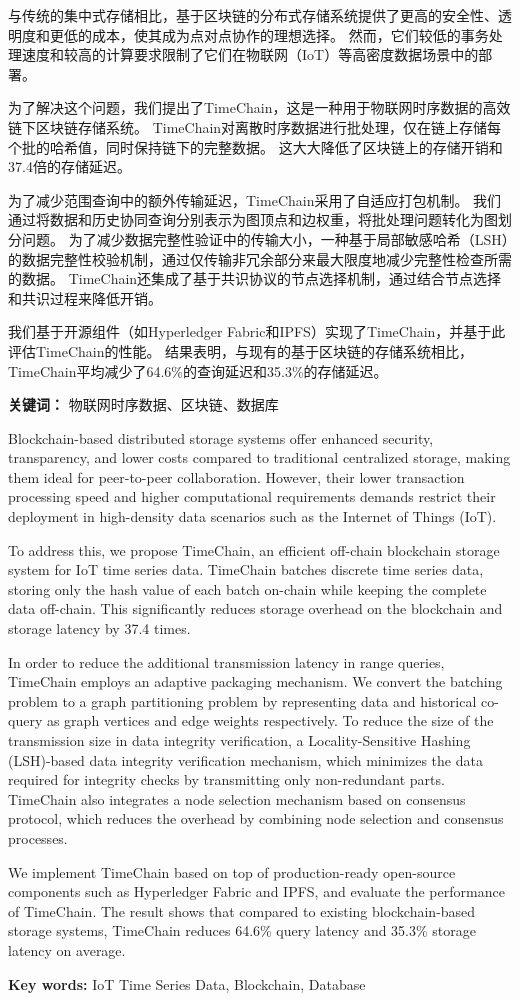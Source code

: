 \cleardoublepage
{}
与传统的集中式存储相比，基于区块链的分布式存储系统提供了更高的安全性、透明度和更低的成本，使其成为点对点协作的理想选择。
然而，它们较低的事务处理速度和较高的计算要求限制了它们在物联网（IoT）等高密度数据场景中的部署。

为了解决这个问题，我们提出了TimeChain，这是一种用于物联网时序数据的高效链下区块链存储系统。
TimeChain对离散时序数据进行批处理，仅在链上存储每个批的哈希值，同时保持链下的完整数据。
这大大降低了区块链上的存储开销和37.4倍的存储延迟。

为了减少范围查询中的额外传输延迟，TimeChain采用了自适应打包机制。
我们通过将数据和历史协同查询分别表示为图顶点和边权重，将批处理问题转化为图划分问题。
为了减少数据完整性验证中的传输大小，一种基于局部敏感哈希（LSH）的数据完整性校验机制，通过仅传输非冗余部分来最大限度地减少完整性检查所需的数据。
TimeChain还集成了基于共识协议的节点选择机制，通过结合节点选择和共识过程来降低开销。

我们基于开源组件（如Hyperledger Fabric和IPFS）实现了TimeChain，并基于此评估TimeChain的性能。
结果表明，与现有的基于区块链的存储系统相比，TimeChain平均减少了64.6\%的查询延迟和35.3\%的存储延迟。

{\noindent \textbf{关键词：} 物联网时序数据、区块链、数据库}

\cleardoublepage
{}
Blockchain-based distributed storage systems offer enhanced security, transparency, and lower costs compared to traditional centralized storage, making them ideal for peer-to-peer collaboration. 
However, their lower transaction processing speed and higher computational requirements demands restrict their deployment in high-density data scenarios such as the Internet of Things (IoT).

To address this, we propose TimeChain, an efficient off-chain blockchain storage system for IoT time series data.
TimeChain batches discrete time series data, storing only the hash value of each batch on-chain while keeping the complete data off-chain. 
This significantly reduces storage overhead on the blockchain and storage latency by 37.4 times. 

In order to reduce the additional transmission latency in range queries, TimeChain employs an adaptive packaging mechanism. 
We convert the batching problem to a graph partitioning problem by representing data and historical co-query as graph vertices and edge weights respectively.
To reduce the size of the transmission size in data integrity verification, a Locality-Sensitive Hashing (LSH)-based data integrity verification mechanism, which minimizes the data required for integrity checks by transmitting only non-redundant parts. 
TimeChain also integrates a node selection mechanism based on consensus protocol, which reduces the overhead by combining node selection and consensus processes.

We implement TimeChain based on top of production-ready open-source components such as Hyperledger Fabric and IPFS, and evaluate the performance of TimeChain. 
The result shows that compared to existing blockchain-based storage systems, TimeChain reduces 64.6\% query latency and 35.3\% storage latency on average.


{\noindent \textbf{Key words:} IoT Time Series Data, Blockchain, Database}
